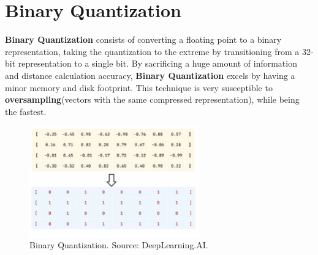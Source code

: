 \section{Binary Quantization}
\textbf{Binary Quantization} consists of converting a floating point to a binary representation, taking the quantization to the extreme by transitioning from a 32-bit representation to a single bit. By sacrificing a huge amount of information and distance calculation accuracy, \textbf{Binary Quantization} excels by having a minor memory and disk footprint. This technique is very susceptible to \textbf{oversampling}(vectors with the same compressed representation), while being the fastest.
\begin{figure}[h]
    \centering
\includegraphics[width=0.65\textwidth]{IMAGES/immagine_2025-02-27_123438887.png}
    \caption[Binary Quantization.]{Binary Quantization. Source: DeepLearning.AI.\footnotemark[1]}
    \label{fig:BQ}
\end{figure}

